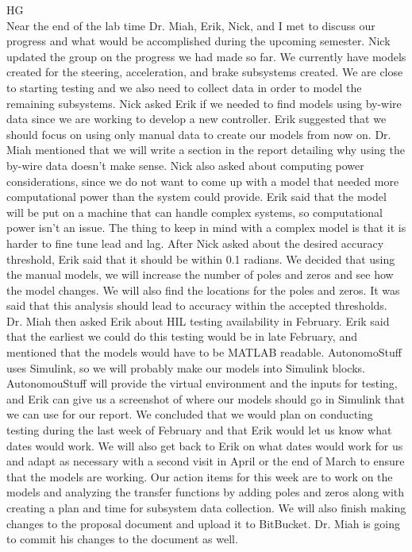 \documentclass[fontsize=11pt, %
                             paper=letter, %
                             openany, %
                             captions=tableheading,
                             index=totoc,
                             hyperref]{labbook}
\begin{document}
\begin{addmargin}[0cm]{0cm}
HG\\
Near the end of the lab time Dr. Miah, Erik, Nick, and I met to discuss our progress and what would be accomplished during the upcoming semester. Nick updated the group on the progress we had made so far. We currently have models created for the steering, acceleration, and brake subsystems created. We are close to starting testing and we also need to collect data in order to model the remaining subsystems. Nick asked Erik if we needed to find models using by-wire data since we are working to develop a new controller. Erik suggested that we should focus on using only manual data to create our models from now on. Dr. Miah mentioned that we will write a section in the report detailing why using the by-wire data doesn't make sense. Nick also asked about computing power considerations, since we do not want to come up with a model that needed more computational power than the system could provide. Erik said that the model will be put on a machine that can handle complex systems, so computational power isn't an issue. The thing to keep in mind with a complex model is that it is harder to fine tune lead and lag. After Nick asked about the desired accuracy threshold, Erik said that it should be within 0.1 radians. We decided that using the manual models, we will increase the number of poles and zeros and see how the model changes. We will also find the locations for the poles and zeros. It was said that this analysis should lead to accuracy within the accepted thresholds. Dr. Miah then asked Erik about HIL testing availability in February. Erik said that the earliest we could do this testing would be in late February, and mentioned that the models would have to be MATLAB readable. AutonomoStuff uses Simulink, so we will probably make our models into Simulink blocks. AutonomouStuff will provide the virtual environment and the inputs for testing, and Erik can give us a screenshot of where our models should go in Simulink that we can use for our report. We concluded that we would plan on conducting testing during the last week of February and that Erik would let us know what dates would work. We will also get back to Erik on what dates would work for us and adapt as necessary with a second visit in April or the end of March to ensure that the models are working. Our action items for this week are to work on the models and analyzing the transfer functions by adding poles and zeros along with creating a plan and time for subsystem data collection. We will also finish making changes to the proposal document and upload it to BitBucket. Dr. Miah is going to commit his changes to the document as well. 



\end{addmargin}
\end{document}
